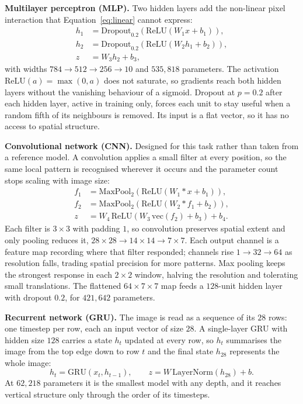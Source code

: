 \textbf{Multilayer perceptron (MLP).} Two hidden layers add the non-linear pixel interaction that
Equation~\ref{eq:linear} cannot express:
\begin{equation}
\begin{aligned}
    h_1 &= \mathrm{Dropout}_{0.2}(\mathrm{ReLU}(W_1 x + b_1)), \\
    h_2 &= \mathrm{Dropout}_{0.2}(\mathrm{ReLU}(W_2 h_1 + b_2)), \\
    z   &= W_3 h_2 + b_3,
\end{aligned}
\end{equation}
with widths $784 \to 512 \to 256 \to 10$ and $535{,}818$ parameters. The activation
$\mathrm{ReLU}(a) = \max(0, a)$ does not saturate, so gradients reach both hidden layers without
the vanishing behaviour of a sigmoid. Dropout at $p = 0.2$ after each hidden layer, active in
training only, forces each unit to stay useful when a random fifth of its neighbours is removed.
Its input is a flat vector, so it has no access to spatial structure.

\textbf{Convolutional network (CNN).} Designed for this task rather than taken from a reference
model. A convolution applies a small filter at every position, so the same local pattern is
recognised wherever it occurs and the parameter count stops scaling with image size:
\begin{equation}
\begin{aligned}
    f_1 &= \mathrm{MaxPool}_2(\mathrm{ReLU}(W_1 * x + b_1)), \\
    f_2 &= \mathrm{MaxPool}_2(\mathrm{ReLU}(W_2 * f_1 + b_2)), \\
    z   &= W_4\,\mathrm{ReLU}(W_3\,\mathrm{vec}(f_2) + b_3) + b_4.
\end{aligned}
\end{equation}
Each filter is $3 \times 3$ with padding $1$, so convolution preserves spatial extent and only
pooling reduces it, $28 \times 28 \to 14 \times 14 \to 7 \times 7$. Each output channel is a
feature map recording where that filter responded; channels rise $1 \to 32 \to 64$ as resolution
falls, trading spatial precision for more patterns. Max pooling keeps the strongest response in
each $2 \times 2$ window, halving the resolution and tolerating small translations. The flattened
$64 \times 7 \times 7$ map feeds a $128$-unit hidden layer with dropout $0.2$, for $421{,}642$
parameters.

\textbf{Recurrent network (GRU).} The image is read as a sequence of its $28$ rows: one timestep
per row, each an input vector of size $28$. A single-layer GRU \cite{cho2014gru} with hidden size
$128$ carries a state $h_t$ updated at every row, so $h_t$ summarises the image from the top edge
down to row $t$ and the final state $h_{28}$ represents the whole image:
\begin{equation}
    h_t = \mathrm{GRU}(x_t, h_{t-1}), \qquad
    z = W\,\mathrm{LayerNorm}(h_{28}) + b.
\end{equation}
At $62{,}218$ parameters it is the smallest model with any depth, and it reaches vertical
structure only through the order of its timesteps.

